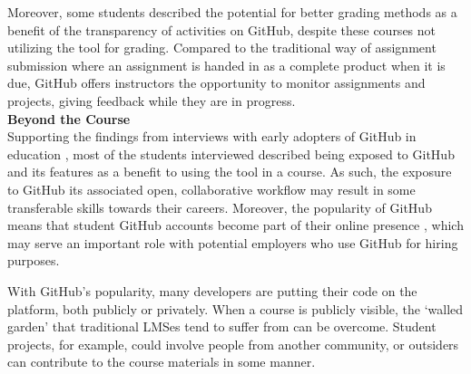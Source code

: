 Moreover, some students described the potential for better grading methods as a benefit of the transparency of activities on GitHub, despite these courses not utilizing the tool for grading. Compared to the traditional way of assignment submission where an assignment is handed in as a complete product when it is due, GitHub offers instructors the opportunity to monitor assignments and projects, giving feedback while they are in progress. \\

\textbf{Beyond the Course} \\
Supporting the findings from interviews with early adopters of GitHub in education \cite{zagalsky}, most of the students interviewed described being exposed to GitHub and its features as a benefit to using the tool in a course. As such, the exposure to GitHub its associated open, collaborative workflow may result in some transferable skills towards their careers. Moreover, the popularity of GitHub means that student GitHub accounts become part of their online presence \cite{treude2012programming}, which may serve an important role with potential employers who use GitHub for hiring purposes.

With GitHub's popularity, many developers are putting their code on the platform, both publicly or privately. When a course is publicly visible, the `walled garden' that traditional LMSes tend to suffer from \cite{mott2010envisioning} can be overcome. Student projects, for example, could involve people from another community, or outsiders can contribute to the course materials in some manner. \\

%

